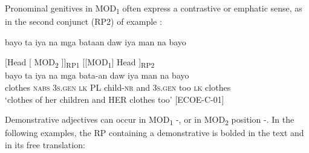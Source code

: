 Pronominal genitives in MOD\textsubscript{1} often express a contrastive or emphatic sense, as in the second conjunct (RP2) of example :

\ea
\label{bkm:Ref343925554}
bayo    ta  iya  na  mga  bataan  daw    iya  man  na  bayo \\\smallskip

[Head  [\hspace{36pt}         MOD\textsubscript{2} \hspace{46pt}  ]]\textsubscript{RP1} \hspace{6pt} [[MOD\textsubscript{1}] \hspace{22pt}         Head ]\textsubscript{RP2} \\
\gll bayo    ta  iya  na  mga  bata-an  daw    iya  man  na  bayo \\
clothes    \textsc{nabs}  3\textsc{s.gen}  \textsc{lk}  \textsc{PL}  child-\textsc{nr}  and    3\textsc{s.gen}  too  \textsc{lk}  clothes \\
\glt ‘clothes of her children and HER clothes too’ [ECOE-C-01]
\z

Demonstrative adjectives can occur in MOD\textsubscript{1} -, or in MOD\textsubscript{2} position -. In the following examples, the RP containing a demonstrative is bolded in the text and in its free translation:

